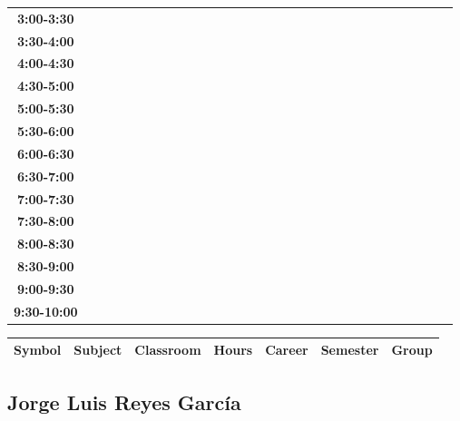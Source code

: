 \documentclass{article}
\begin{document}
\begin{table}[ht]
\begin{tabular}{|c|c|c|c|c|c|c|c|c|c|c|c|c|c|c|c|c|c|c|c|c|c|c|c|c|c|c|c|c|c|}
\textbf{3:00-3:30} &   &   &   &   &   &   &   \\
 \cline{1-8} 
\textbf{3:30-4:00} &   &   &   &   &   &   &   \\
 \cline{1-8} 
\textbf{4:00-4:30} &   &   &   &   &   &   &   \\
 \cline{1-8} 
\textbf{4:30-5:00} &   &   &   &   &   &   &   \\
 \cline{1-8} 
\textbf{5:00-5:30} &   &   &   &   &   &   &   \\
 \cline{1-8} 
\textbf{5:30-6:00} &   &   &   &   &   &   &   \\
 \cline{1-8} 
\textbf{6:00-6:30} &   &   &   &   &   &   &   \\
 \cline{1-8} 
\textbf{6:30-7:00} &   &   &   &   &   &   &   \\
 \cline{1-8} 
\textbf{7:00-7:30} &   &   &   &   &   &   &   \\
 \cline{1-8} 
\textbf{7:30-8:00} &   &   &   &   &   &   &   \\
 \cline{1-8} 
\textbf{8:00-8:30} &   &   &   &   &   &   &   \\
 \cline{1-8} 
\textbf{8:30-9:00} &   &   &   &   &   &   &   \\
 \cline{1-8} 
\textbf{9:00-9:30} &   &   &   &   &   &   &   \\
 \cline{1-8} 
\textbf{9:30-10:00} &   &   &   &   &   &   &   \\
 \cline{1-8} 
\end{tabular}\end{table}

        
        \begin{tabular}{|>{\centering\arraybackslash}m{2cm}|>{\centering\arraybackslash}m{4cm}|>{\centering\arraybackslash}m{2cm}|>{\centering\arraybackslash}m{2cm}|>{\centering\arraybackslash}m{2cm}|>{\centering\arraybackslash}m{2cm}|>{\centering\arraybackslash}m{2cm}|}
        \hline
        \textbf{Symbol} & \textbf{Subject} & \textbf{Classroom} & \textbf{Hours} & \textbf{Career} & \textbf{Semester} & \textbf{Group} \\
        \hline
        \end{tabular}
                    

        \newpage
        

        \subsection{Jorge Luis Reyes Garc\'ia}
        \vspace*{.1cm}
        
\end{document}
